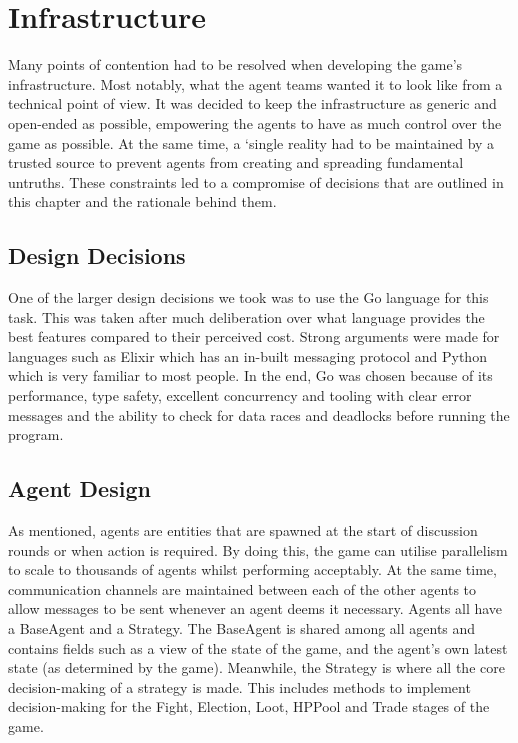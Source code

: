 \chapter{Infrastructure}\label{sec:infra}

Many points of contention had to be resolved when developing the game’s infrastructure. Most notably, what the agent teams wanted it to look like from a technical point of view. It was decided to keep the infrastructure as generic and open-ended as possible, empowering the agents to have as much control over the game as possible. At the same time, a ‘single reality had to be maintained by a trusted source to prevent agents from creating and spreading fundamental untruths. These constraints led to a compromise of decisions that are outlined in this chapter and the rationale behind them.

\section{Design Decisions}
One of the larger design decisions we took was to use the Go language for this task. This was taken after much deliberation over what language provides the best features compared to their perceived cost. Strong arguments were made for languages such as Elixir which has an in-built messaging protocol and Python which is very familiar to most people. In the end, Go was chosen because of its performance, type safety, excellent concurrency and tooling with clear error messages and the ability to check for data races and deadlocks before running the program.

\section{Agent Design}
As mentioned, agents are entities that are spawned at the start of discussion rounds or when action is required. By doing this, the game can utilise parallelism to scale to thousands of agents whilst performing acceptably. At the same time, communication channels are maintained between each of the other agents to allow messages to be sent whenever an agent deems it necessary.
Agents all have a BaseAgent and a Strategy. The BaseAgent is shared among all agents and contains fields such as a view of the state of the game, and the agent’s own latest state (as determined by the game). Meanwhile, the Strategy is where all the core decision-making of a strategy is made. This includes methods to implement decision-making for the Fight, Election, Loot, HPPool and Trade stages of the game.


